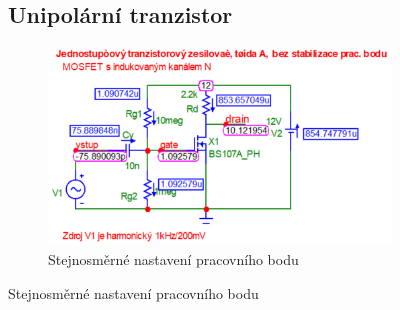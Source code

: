 \documentclass{article}
\begin{document}
\begin{figure}[H]
  \begin{minipage}[t]{0.4\textwidth}
    \subsection{Unipolární tranzistor}
  \end{minipage}
  \begin{minipage}[t]{0.6\textwidth}
    \begin{figure}[H]
      \includegraphics[width=\textwidth]{PC/UNI/napeti_a_proudy.png}
      \caption{\label{UNI_naperi_a_proudy} Stejnosměrné nastavení pracovního bodu}
    \end{figure}
  \end{minipage}
  

\end{figure}
\end{document}
